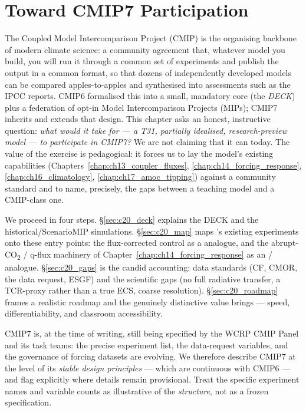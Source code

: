 \chapter{Toward CMIP7 Participation}\label{chap:ch20_cmip7}

\providecommand{\degr}{^{\circ}}             %
\providecommand{\Wm}{\,\mathrm{W\,m^{-2}}}   %

The Coupled Model Intercomparison Project (CMIP) is the organising backbone of
modern climate science: a community agreement that, whatever model you build, you
will run it through a common set of experiments and publish the output in a common
format, so that dozens of independently developed models can be compared
apples-to-apples and synthesised into assessments such as the IPCC reports. CMIP6
\citep{eyring2016cmip6} formalised this into a small, mandatory core (the
\emph{DECK}) plus a federation of opt-in Model Intercomparison Projects (MIPs);
CMIP7 inherits and extends that design. This chapter asks an honest, instructive
question: \emph{what would it take for \model{} --- a T31, partially idealised,
research-preview model --- to participate in CMIP7?} We are not claiming that it
can today. The value of the exercise is pedagogical: it forces us to lay the
model's existing capabilities (Chapters~\ref{chap:ch13_coupler_fluxes},
\ref{chap:ch14_forcing_response}, \ref{chap:ch16_climatology},
\ref{chap:ch17_amoc_tipping}) against a community standard and to name, precisely,
the gaps between a teaching model and a CMIP-class one.

We proceed in four steps. \S\ref{sec:c20_deck} explains the DECK and the
historical/ScenarioMIP simulations. \S\ref{sec:c20_map} maps \model{}'s existing
experiments onto these entry points: the flux-corrected control as a
 analogue, and the abrupt-CO\textsubscript{2} / q-flux machinery of
Chapter~\ref{chap:ch14_forcing_response} as an  /
 analogue. \S\ref{sec:c20_gaps} is the candid accounting: data
standards (CF, CMOR, the data request, ESGF) and the scientific gaps (no full
radiative transfer, a TCR-proxy rather than a true ECS, coarse resolution).
\S\ref{sec:c20_roadmap} frames a realistic roadmap and the genuinely distinctive
value \model{} brings --- speed, differentiability, and classroom accessibility.

\begin{remark}
CMIP7 is, at the time of writing, still being specified by the WCRP CMIP Panel and
its task teams: the precise experiment list, the data-request variables, and the
governance of forcing datasets are evolving. We therefore describe CMIP7 at the
level of its \emph{stable design principles} --- which are continuous with CMIP6
\citep{eyring2016cmip6} --- and flag explicitly where details remain provisional.
Treat the specific experiment names and variable counts as illustrative of the
\emph{structure}, not as a frozen specification.
\end{remark}

